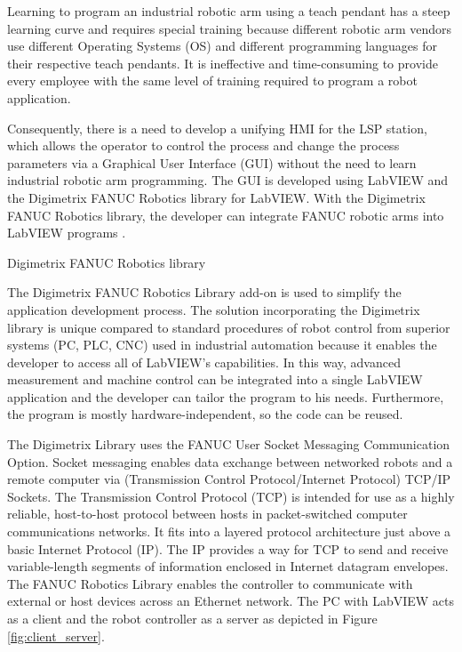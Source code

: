 Learning to program an industrial robotic arm using a teach pendant has a steep learning curve and requires special training because different robotic arm vendors use different Operating Systems (OS) and different programming languages for their respective teach pendants. It is ineffective and time-consuming to provide every employee with the same level of training required to program a robot application. 

Consequently, there is a need to develop a unifying HMI for the LSP station, which allows the operator to control the process and change the process parameters via a Graphical User Interface (GUI) without the need to learn industrial robotic arm programming. The GUI is developed using LabVIEW and the Digimetrix FANUC Robotics library for LabVIEW. With the Digimetrix FANUC Robotics library, the developer can integrate FANUC robotic arms into LabVIEW programs \cite{bohm_kaufman_brajer_rostohar_2019}. 

\smallskip
Digimetrix FANUC Robotics library

The Digimetrix FANUC Robotics Library add-on is used to simplify the application development process. The solution incorporating the Digimetrix library is unique compared to standard procedures of robot control from superior systems (PC, PLC, CNC) used in industrial automation because it enables the developer to access all of LabVIEW's capabilities. In this way, advanced measurement and machine control can be integrated into a single LabVIEW application and the developer can tailor the program to his needs. Furthermore, the program is mostly hardware-independent, so the code can be reused.

The Digimetrix Library uses the FANUC User Socket Messaging Communication Option. Socket messaging enables data exchange between networked robots and a remote computer via (Transmission Control Protocol/Internet Protocol) TCP/IP Sockets. The Transmission Control Protocol (TCP) is intended for use as a highly reliable, host-to-host protocol between hosts in packet-switched computer communications networks. It fits into a layered protocol architecture just above a basic Internet Protocol (IP). The IP provides a way for TCP to send and receive variable-length segments of information enclosed in Internet datagram envelopes. The FANUC Robotics Library enables the controller to communicate with external or host devices across an Ethernet network. The PC with LabVIEW acts as a client and the robot controller as a server as depicted in Figure \ref{fig:client_server}.

